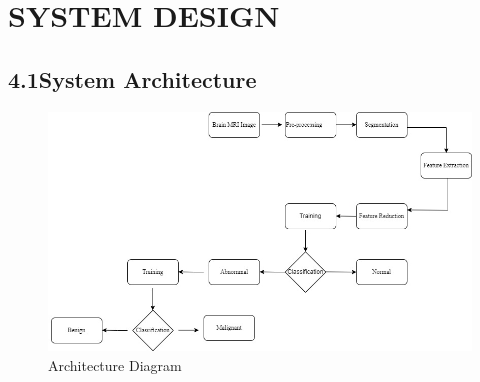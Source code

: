 \documentclass[oneside,a4paper,12pt]{book}
\begin{document}
\vspace{\baselineskip}
\setlength{\parskip}{0.0pt}
\setlength{\parskip}{9.96pt}

\vspace{\baselineskip}
\setlength{\parskip}{0.0pt}
\setlength{\parskip}{9.96pt}

\vspace{\baselineskip}
\setlength{\parskip}{0.0pt}
\setlength{\parskip}{9.96pt}

\vspace{\baselineskip}
\setlength{\parskip}{0.0pt}
\setlength{\parskip}{9.96pt}

\vspace{\baselineskip}
\setlength{\parskip}{0.0pt}
\setlength{\parskip}{9.96pt}

\vspace{\baselineskip}

\vspace{\baselineskip}
\chapter{SYSTEM DESIGN}\par




\newpage

\vspace{\baselineskip}\section*{4.1\hspace*{10pt}System Architecture}
\vspace{\baselineskip}


\begin{Center}
\begin{figure}[H]
	\begin{Center}
		\includegraphics[width=1.1\linewidth]{archi.jpg}
		\caption{Architecture Diagram}
		\label{fig:Architecture_Diagram}
	\end{Center}
\end{figure}
\end{Center}\par
\end{document}
